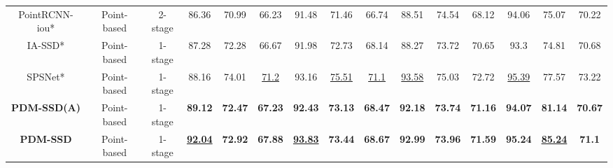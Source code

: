 \begin{table}
{\begin{tabular}{c|c|c|ccc|ccc|ccc|ccc}
		PointRCNN-iou* \cite{shi2019pointrcnn}          & Point-based                & 2-stage               & 86.36                 & 70.99          & 66.23          & 91.48                  & 71.46          & 66.74          & 88.51          & 74.54          & 68.12          & 94.06          & 75.07                  & 70.22          \\
		IA-SSD* \cite{zhang2022not}                 & Point-based                & 1-stage               & 87.28                 & 72.28          & 66.67          & 91.98                  & 72.73          & 68.14          & 88.27          & 73.72          & 70.65          & 93.3           & 74.81                  & 70.68          \\
		SPSNet* \cite{liang2023spsnet}                 & Point-based                & 1-stage               & 88.16                 & 74.01          & \uline{71.2}   & 93.16                  & \uline{75.51}  & \uline{71.1}   & \uline{93.58}  & 75.03          & 72.72          & \uline{95.39}  & 77.57                  & 73.22          \\
		\textbf{PDM-SSD(A)}              & Point-based                & 1-stage               & \textbf{89.12} & \textbf{72.47} & \textbf{67.23} & \textbf{92.43} & \textbf{73.13}         & \textbf{68.47} & \textbf{92.18} & \textbf{73.74} & \textbf{71.16} & \textbf{94.07} & \textbf{81.14}  & \textbf{70.67}  \\
		\textbf{PDM-SSD}                 & Point-based                & 1-stage               & \textbf{\uline{92.04}} & \textbf{72.92} & \textbf{67.88} & \textbf{\uline{93.83}} & \textbf{73.44} & \textbf{68.67} & \textbf{92.99} & \textbf{73.96} & \textbf{71.59} & \textbf{95.24} & \textbf{\uline{85.24}} & \textbf{71.1}  \\
		\bottomrule
	\end{tabular}}
\label{tabel3}
\end{table}